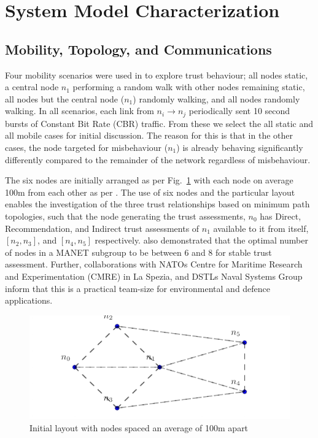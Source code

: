 \documentclass[conference]{IEEEtran}
\begin{document}
\section{System Model Characterization}\label{sec:initialsystemcharacterization}


\subsection{Mobility, Topology, and Communications}

Four mobility scenarios were used in \cite{Guo11} to explore trust behaviour; all nodes static, a central node $n_1$ performing a random walk with other nodes remaining static, all nodes but the central node ($n_1$) randomly walking, and all nodes randomly walking. 
In all scenarios, each link from $n_i \rightarrow n_j$ periodically sent 10 second bursts of Constant Bit Rate (CBR) traffic.
From these we select the all static and all mobile cases for initial discussion.
The reason for this is that in the other cases, the node targeted for misbehaviour ($n_1$) is already behaving significantly differently compared to the remainder of the network regardless of misbehaviour.

The six nodes are initially arranged as per Fig.~\ref{fig:s1_layout} with each node on average 100m from each other as per \cite{Guo11}.
The use of six nodes and the particular layout enables the investigation of the three trust relationships based on minimum path topologies, such that the node generating the trust assessments, $n_0$ has Direct, Recommendation, and Indirect trust assessments of $n_1$ available to it from itself, $[n_2,n_3]$, and $[n_4,n_5]$ respectively. 
\cite{Guo11} also demonstrated that the optimal number of nodes in a MANET subgroup to be between 6 and 8 for stable trust assessment. 
Further, collaborations with NATOs Centre for Maritime Research and Experimentation (CMRE) in La Spezia, and DSTLs Naval Systems Group inform that this is a practical team-size for environmental and defence applications.

%
\begin{figure}[h]
  \centering
  \includegraphics[width=.45\textwidth]{img/s1_layout}
  \caption{Initial layout with nodes spaced an average of 100m apart}
  \label{fig:s1_layout}
\end{figure}
%
\end{document}
